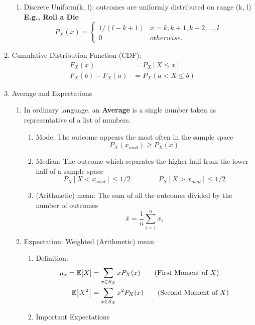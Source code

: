 \begin{enumerate}
{\begin{enumerate}
{            }
            \item Discrete Uniform(k, l): outcomes are uniformly distributed on range (k, l) \textbf{E.g., Roll a Die}{
                \[ P_X(x) = 
                \begin{cases}
                    1/(l-k+1)   & x=k,k+1,k+2,\ldots,l \\
                    0   & otherwise.
                \end{cases} \]
            }            
        \end{enumerate}
    }
    \item Cumulative Distribution Function (CDF): {
        \begin{align*}
            F_X(x)&=P_X[X\leq x] \\
            F_X(b)-F_X(a)&=P_X(a<X\leq b)
        \end{align*}
    }
    \item Average and Expectations{
        \begin{enumerate}
            \item In ordinary language, an \textbf{Average} is a single number taken as representative of a list of numbers.{
            \begin{enumerate}
                \item Mode: The outcome appears the most often in the sample space \[P_X(x_{mod})\geq P_X(x)\]
                \item Median: The outcome which separates the higher half from  the lower half of a sample space \[P_X[X < x_{med}] \leq 1/2 \qquad \qquad P_X[X > x_{med}] \leq 1/2\]
                \item (Arithmetic) mean:  The sum of all the outcomes divided by the number of outcomes \[\bar{x} = \frac{1}{n}\sum_{i=1}^{n}x_i\]
            \end{enumerate}
            }
            \item Expectation: Weighted (Arithmetic) mean{
                \begin{enumerate}
                    \item Definition:{
                        \begin{align}
                            \mu_x = \E{X}&=\sum_{x\in S_X}xP_X(x) \tag{First Moment of $X$}\\
                            \E{X^2}&=\sum_{x\in S_X}x^2P_X(x) \tag{Second Moment of $X$}
                        \end{align}
                    }
                    \item Important Expectations{
}
\end{enumerate}}
\end{enumerate}}
\end{enumerate}
